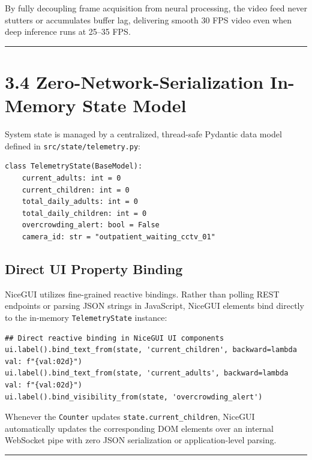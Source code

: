 By fully decoupling frame acquisition from neural processing, the video
feed never stutters or accumulates buffer lag, delivering smooth 30 FPS
video even when deep inference runs at 25--35 FPS.

\begin{center}\rule{0.5\linewidth}{0.5pt}\end{center}

\section{3.4 Zero-Network-Serialization In-Memory State
Model}\label{zero-network-serialization-in-memory-state-model}

System state is managed by a centralized, thread-safe Pydantic data
model defined in \texttt{src/state/telemetry.py}:

\begin{verbatim}
class TelemetryState(BaseModel):
    current_adults: int = 0
    current_children: int = 0
    total_daily_adults: int = 0
    total_daily_children: int = 0
    overcrowding_alert: bool = False
    camera_id: str = "outpatient_waiting_cctv_01"
\end{verbatim}

\subsection{Direct UI Property
Binding}\label{direct-ui-property-binding}

NiceGUI utilizes fine-grained reactive bindings. Rather than polling
REST endpoints or parsing JSON strings in JavaScript, NiceGUI elements
bind directly to the in-memory \texttt{TelemetryState} instance:

\begin{verbatim}
## Direct reactive binding in NiceGUI UI components
ui.label().bind_text_from(state, 'current_children', backward=lambda val: f"{val:02d}")
ui.label().bind_text_from(state, 'current_adults', backward=lambda val: f"{val:02d}")
ui.label().bind_visibility_from(state, 'overcrowding_alert')
\end{verbatim}

Whenever the \texttt{Counter} updates \texttt{state.current\_children},
NiceGUI automatically updates the corresponding DOM elements over an
internal WebSocket pipe with zero JSON serialization or
application-level parsing.

\begin{center}\rule{0.5\linewidth}{0.5pt}\end{center}

